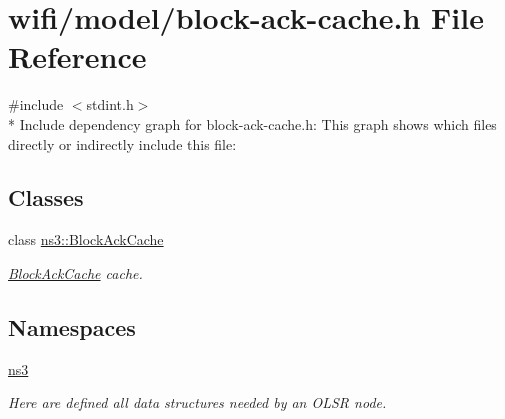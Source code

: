\hypertarget{block-ack-cache_8h}{}\section{wifi/model/block-\/ack-\/cache.h File Reference}
\label{block-ack-cache_8h}
{\ttfamily \#include $<$stdint.\+h$>$}\\*
Include dependency graph for block-\/ack-\/cache.h\+:
This graph shows which files directly or indirectly include this file\+:
\subsection*{Classes}
\begin{DoxyCompactItemize}
\item 
class \hyperlink{classns3_1_1BlockAckCache}{ns3\+::\+Block\+Ack\+Cache}
\begin{DoxyCompactList}\small\item\em \hyperlink{classns3_1_1BlockAckCache}{Block\+Ack\+Cache} cache. \end{DoxyCompactList}\end{DoxyCompactItemize}
\subsection*{Namespaces}
\begin{DoxyCompactItemize}
\item 
 \hyperlink{namespacens3}{ns3}
\begin{DoxyCompactList}\small\item\em Here are defined all data structures needed by an O\+L\+SR node. \end{DoxyCompactList}\end{DoxyCompactItemize}
